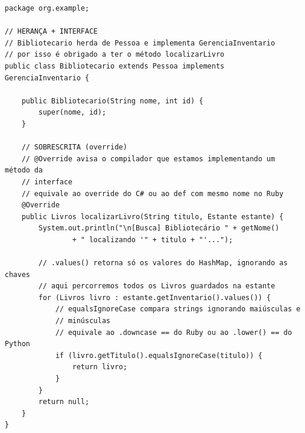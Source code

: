 \begin{lstlisting}[style=java, caption={Exemplo de Aplicação de POO em Java: \texttt{Bibliotecario.java}}]
package org.example;

// HERANÇA + INTERFACE
// Bibliotecario herda de Pessoa e implementa GerenciaInventario
// por isso é obrigado a ter o método localizarLivro
public class Bibliotecario extends Pessoa implements GerenciaInventario {

    public Bibliotecario(String nome, int id) {
        super(nome, id);
    }

    // SOBRESCRITA (override)
    // @Override avisa o compilador que estamos implementando um método da
    // interface
    // equivale ao override do C# ou ao def com mesmo nome no Ruby
    @Override
    public Livros localizarLivro(String titulo, Estante estante) {
        System.out.println("\n[Busca] Bibliotecário " + getNome()
                + " localizando '" + titulo + "'...");

        // .values() retorna só os valores do HashMap, ignorando as chaves
        // aqui percorremos todos os Livros guardados na estante
        for (Livros livro : estante.getInventario().values()) {
            // equalsIgnoreCase compara strings ignorando maiúsculas e
            // minúsculas
            // equivale ao .downcase == do Ruby ou ao .lower() == do Python
            if (livro.getTitulo().equalsIgnoreCase(titulo)) {
                return livro;
            }
        }
        return null;
    }
}
\end{lstlisting}

